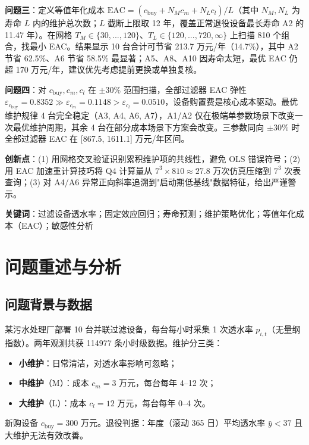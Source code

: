 \documentclass[12pt, a4paper, fontset=fandol]{ctexart}
\theoremstyle{definition}
\begin{document}
\textbf{问题三}：定义等值年化成本 $\mathrm{EAC} = (c_{\text{buy}} + N_M c_m + N_L c_l)/L$（其中 $N_M, N_L$ 为寿命 $L$ 内的维护总次数；$L$ 截断上限取 12 年，覆盖正常退役设备最长寿命 A2 的 11.47 年）。在网格 $T_M \in \{30,...,120\}$、$T_L \in \{120,...,720, \infty\}$ 上扫描 810 个组合，找最小 EAC。结果显示 10 台合计可节省 213.7 万元/年（14.7\%），其中 A2 节省 62.5\%、A6 节省 58.5\% 最显著；A5、A8、A10 因寿命太短，最优 EAC 仍超 170 万元/年，建议优先考虑提前更换或单独复核。

\textbf{问题四}：对 $c_{\text{buy}}, c_m, c_l$ 在 $\pm 30\%$ 范围扫描，全部过滤器 EAC 弹性 $\varepsilon_{c_{\text{buy}}} = 0.8352 \gg \varepsilon_{c_m} = 0.1148 > \varepsilon_{c_l} = 0.0510$，设备购置费是核心成本驱动。最优维护规律 4 台完全稳定（A3, A4, A6, A7），A1/A2 仅在极端单参数场景下改变一次最优维护周期，其余 4 台在部分成本场景下方案会改变。三参数同向 $\pm 30\%$ 时全部过滤器 EAC 在 [867.5, 1611.1] 万元/年区间。

\textbf{创新点}：(1) 用网格交叉验证识别累积维护项的共线性，避免 OLS 错误符号；(2) 用 EAC 加速重计算技巧将 Q4 计算量从 $7^3 \times 810 \approx 27.8$ 万次仿真压缩到 $7^3$ 次表查询；(3) 对 A4/A6 异常正向斜率追溯到"启动期低基线"数据特征，给出严谨警示。

\textbf{关键词}：过滤设备透水率；固定效应回归；寿命预测；维护策略优化；等值年化成本（EAC）；敏感性分析
\endgroup

\vfill

\restoregeometry
\hypersetup{linkcolor=black}
\tableofcontents
\newpage

\section{问题重述与分析}

\subsection{问题背景与数据}
某污水处理厂部署 10 台并联过滤设备，每台每小时采集 1 次透水率 $p_{i,t}$（无量纲指数）。两年观测共获 114977 条小时级数据。维护分三类：
\begin{itemize}[leftmargin=2em]
  \item \textbf{小维护}：日常清洁，对透水率影响可忽略；
  \item \textbf{中维护}（M）：成本 $c_m = 3$ 万元，每台每年 4--12 次；
  \item \textbf{大维护}（L）：成本 $c_l = 12$ 万元，每台每年 0--4 次。
\end{itemize}
新购设备 $c_{\text{buy}} = 300$ 万元。退役判据：年度（滚动 365 日）平均透水率 $\bar{y} < 37$ 且大维护无法有效改善。
\end{document}
